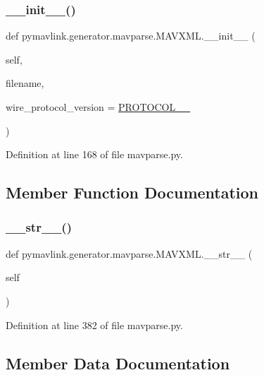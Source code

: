 \subsubsection{\texorpdfstring{\_\_init\_\_()}{\_\_init\_\_()}}
{\footnotesize\ttfamily def pymavlink.\+generator.\+mavparse.\+M\+A\+V\+X\+M\+L.\+\_\+\+\_\+init\+\_\+\+\_\+ (\begin{DoxyParamCaption}\item[{}]{self,  }\item[{}]{filename,  }\item[{}]{wire\+\_\+protocol\+\_\+version = {\ttfamily \mbox{\hyperlink{namespacepymavlink_1_1generator_1_1mavparse_a2f1946ee948a684dcbdd0bf5afee5689}{P\+R\+O\+T\+O\+C\+O\+L\+\_\+\_}}} }\end{DoxyParamCaption})}



Definition at line 168 of file mavparse.\+py.



\subsection{Member Function Documentation}
\mbox{\label{classpymavlink_1_1generator_1_1mavparse_1_1MAVXML_a598e17d0cf02fc8a0d557e66b31549a1}} 
\subsubsection{\texorpdfstring{\_\_str\_\_()}{\_\_str\_\_()}}
{\footnotesize\ttfamily def pymavlink.\+generator.\+mavparse.\+M\+A\+V\+X\+M\+L.\+\_\+\+\_\+str\+\_\+\+\_\+ (\begin{DoxyParamCaption}\item[{}]{self }\end{DoxyParamCaption})}



Definition at line 382 of file mavparse.\+py.



\subsection{Member Data Documentation}
\mbox{\label{classpymavlink_1_1generator_1_1mavparse_1_1MAVXML_a76d896a773b538933a466f9481ae8b82}} 
